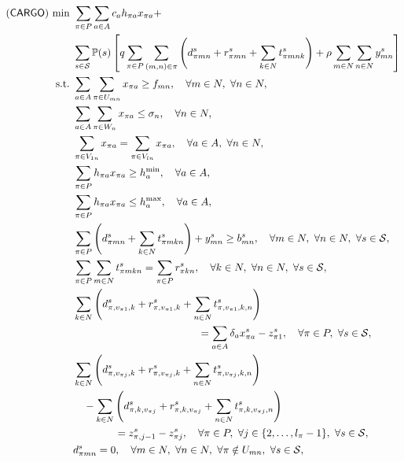 \begin{subequations} \label{cargo:formulation}
	\begin{align}
	(\cargo)\ \textrm{min}\ &\sum_{\pi\in P}\sum_{a\in A}c_a h_{\pi a}x_{\pi a}+ \nonumber \\ &\sum_{s\in\mathcal{S}}\PP(s)\left[q\sum_{\pi\in P}\sum_{(m,n)\in\pi}\left(d_{\pi m n}^s+r_{\pi m n}^s+\sum_{k\in N}t_{\pi m n k}^s\right)+\rho\sum_{m\in N}\sum_{n\in N}y_{mn}^s \right] \label{cargo:obj} \\ 
	\textrm{s.t.}\ & \sum_{a\in A}\sum_{\pi\in U_{mn}}x_{\pi a}\ge f_{mn},\quad\forall m\in N,\ \forall n\in N,\label{cargo:b}\\
	&\sum_{a\in A}\sum_{\pi\in W_n}x_{\pi a}\le \sigma_n,\quad\forall n\in N, \label{cargo:c}\\
	&\sum_{\pi\in V_{1n}}x_{\pi a}=\sum_{\pi\in V_{ln}}x_{\pi a},\quad\forall a\in A,\ \forall n\in N,\label{cargo:d}\\
	&\sum_{\pi\in P}h_{\pi a}x_{\pi a}\ge h_a^{\textrm{min}},\quad\forall a\in A, \label{cargo:e}\\
	&\sum_{\pi\in P}h_{\pi a}x_{\pi a}\le h_a^{\textrm{max}},\quad\forall a\in A, \label{cargo:f}\\	
	&\sum_{\pi \in P}\left(d_{\pi m n}^s+\sum_{k\in N}t_{\pi mkn}^s\right)+y_{mn}^s\ge b_{mn}^s,\quad\forall m\in N,\ \forall n\in N,\ \forall s\in\mathcal{S}, \label{cargo:g}\\
	&\sum_{\pi \in P}\sum_{m\in N}t_{\pi mkn}^s=\sum_{\pi \in P}r_{\pi kn}^s,\quad\forall k\in N,\ \forall n\in N,\ \forall s\in\mathcal{S},\label{cargo:h}\\
	&\sum_{k\in N}\left(d_{\pi,v_{\pi 1},k}^s+r_{\pi,v_{\pi 1},k}^s+\sum_{n\in N}t_{\pi,v_{\pi 1},k,n}^s\right)\nonumber\\
	&\qquad\qquad\qquad\qquad\qquad\qquad=\sum_{a\in A}\delta_a x_{\pi a}^s-z_{\pi 1}^s,\quad\forall \pi\in P,\ \forall s\in\mathcal{S}, \label{cargo:i}\\
	&\sum_{k\in N}\left(d_{\pi,v_{\pi j},k}^s+r_{\pi,v_{\pi j},k}^s+\sum_{n\in N}t_{\pi,v_{\pi j},k,n}^s\right) \nonumber\\
	&\quad-\sum_{k\in N}\left(d_{\pi,k,v_{\pi j}}^s+r_{\pi,k,v_{\pi j}}^s+\sum_{n\in N}t_{\pi,k,v_{\pi j},n}^s\right) \nonumber\\
	&\qquad\qquad=z_{\pi,j-1}^s - z_{\pi j}^s,\quad\forall\pi\in P,\ \forall j\in\{2,\ldots,l_\pi-1\},\ \forall s\in\mathcal{S},\label{cargo:j}\\
	&d_{\pi m n}^s = 0,\quad\forall m\in N,\ \forall n\in N,\ \forall \pi\notin U_{mn},\ \forall s\in\mathcal{S},\label{cargo:k}\\

\end{align}
\end{subequations}
